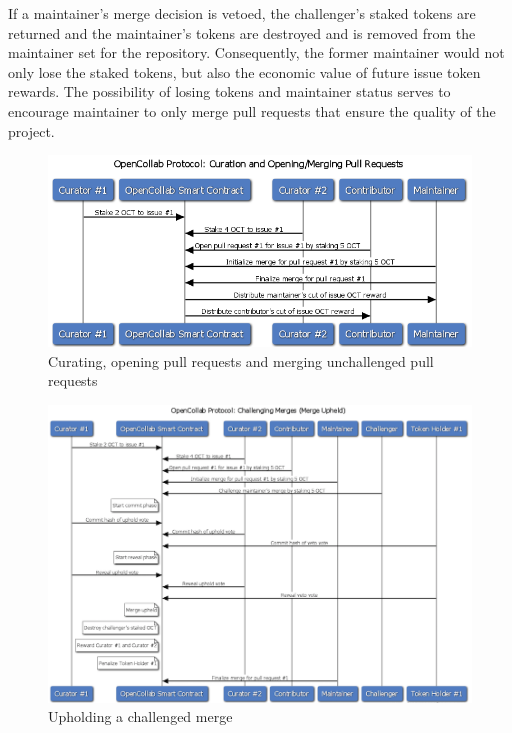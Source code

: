 If a maintainer's merge decision is vetoed, the challenger's staked tokens are
returned and the maintainer's  tokens are destroyed and is removed from the maintainer set for the
repository. Consequently, the former maintainer would not only lose the staked
tokens, but also the economic value of future issue token rewards. The
possibility of losing tokens and maintainer status serves to encourage
maintainer to only merge pull requests that ensure the quality of the project.


\begin{figure}[p!]
  \centering
  \includegraphics[width=\linewidth,keepaspectratio]{figures/OpenCollab-Protocol-Curation-And-Opening-Merging-Pull-Requests.png}
  \caption{Curating, opening pull requests and merging unchallenged pull requests}
\end{figure}

\begin{figure}[p!]
  \centering
  \includegraphics[width=\linewidth,keepaspectratio]{figures/OpenCollab-Protocol-Challenging-Merges-Upheld.png}
  \caption{Upholding a challenged merge}
\end{figure}

